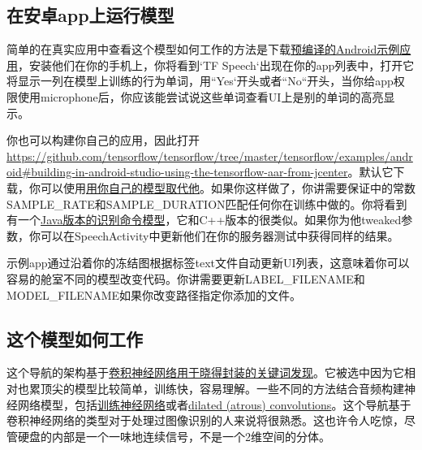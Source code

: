 {\subsection{在安卓app上运行模型}
简单的在真实应用中查看这个模型如何工作的方法是下载\href{https://github.com/tensorflow/tensorflow/tree/master/tensorflow/examples/android#prebuilt-components}{预编译的Android示例应用}，安装他们在你的手机上，你将看到`TF Speech`出现在你的app列表中，打开它将显示一列在模型上训练的行为单词，用``Yes`开头或者``No``开头，当你给app权限使用microphone后，你应该能尝试说这些单词查看UI上是别的单词的高亮显示。

你也可以构建你自己的应用，因此打开\href{github仓库中可用的TensorFlow部分}{https://github.com/tensorflow/tensorflow/tree/master/tensorflow/examples/android#building-in-android-studio-using-the-tensorflow-aar-from-jcenter}。默认它下载，你可以使用\href{https://github.com/tensorflow/tensorflow/tree/master/tensorflow/examples/android#install-model-files-optional}{用你自己的模型取代他}。如果你这样做了，你讲需要保证中的常数SAMPLE\_RATE和SAMPLE\_DURATION匹配任何你在训练中做的。你将看到有一个\href{https://github.com/tensorflow/tensorflow/tree/master/tensorflow/examples/android/src/org/tensorflow/demo/RecognizeCommands.java}{Java版本的识别命令模型}，它和C++版本的很类似。如果你为他tweaked参数，你可以在SpeechActivity中更新他们在你的服务器测试中获得同样的结果。

示例app通过沿着你的冻结图根据标签text文件自动更新UI列表，这意味着你可以容易的舱室不同的模型改变代码。你讲需要更新LABEL\_FILENAME和MODEL\_FILENAME如果你改变路径指定你添加的文件。

\subsection{这个模型如何工作}
这个导航的架构基于\href{http://www.isca-speech.org/archive/interspeech_2015/papers/i15_1478.pdf}{卷积神经网络用于晓得封装的关键词发现}。它被选中因为它相对也累顶尖的模型比较简单，训练快，容易理解。一些不同的方法结合音频构建神经网络模型，包括\href{https://svds.com/tensorflow-rnn-tutorial/}{训练神经网络}或者\href{https://deepmind.com/blog/wavenet-generative-model-raw-audio/}{dilated (atrous) convolutions}。这个导航基于卷积神经网络的类型对于处理过图像识别的人来说将很熟悉。这也许令人吃惊，尽管硬盘的内部是一个一味地连续信号，不是一个2维空间的分体。

}
